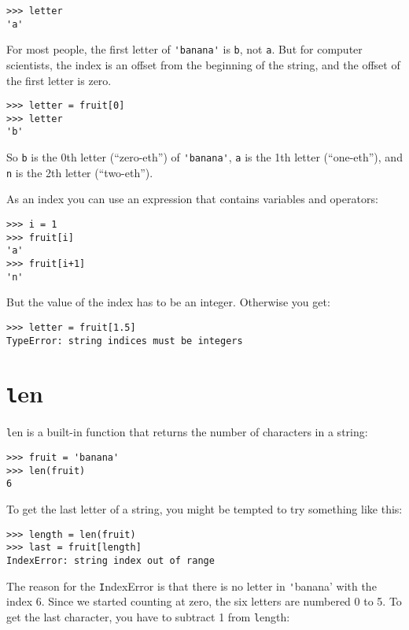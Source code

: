 \documentclass[
DIV=11,
fontsize=12,
twoside,
headinclude=false,
titlepage=firstiscover,
abstract=true,
headsepline=true,
footsepline=true,
chapterprefix=true, %
headings=big,
bibliography=totoc,%
captions=tableheading
]{scrbook}
\theoremstyle{definition}
\begin{document}
\begin{lstlisting}
>>> letter
'a'
\end{lstlisting}
%
For most people, the first letter of \verb"'banana'" is {\texttt b}, not
{\texttt a}.  But for computer scientists, the index is an offset from the
beginning of the string, and the offset of the first letter is zero.

\begin{lstlisting}
>>> letter = fruit[0]
>>> letter
'b'
\end{lstlisting}
%
So {\texttt b} is the 0th letter (``zero-eth'') of \verb"'banana'", {\texttt
  a} is the 1th letter (``one-eth''), and {\texttt n} is the 2th letter
(``two-eth'').   

As an index you can use an expression that contains variables and
operators:

\begin{lstlisting}
>>> i = 1
>>> fruit[i]
'a'
>>> fruit[i+1]
'n'
\end{lstlisting}
%

But the value of the index has to be an integer.  Otherwise you
get:

\begin{lstlisting}
>>> letter = fruit[1.5]
TypeError: string indices must be integers
\end{lstlisting}
%

\section{{\texttt len}}

{\texttt len} is a built-in function that returns the number of characters
in a string:

\begin{lstlisting}
>>> fruit = 'banana'
>>> len(fruit)
6
\end{lstlisting}
%
To get the last letter of a string, you might be tempted to try something
like this:

\begin{lstlisting}
>>> length = len(fruit)
>>> last = fruit[length]
IndexError: string index out of range
\end{lstlisting}
%
The reason for the {\texttt IndexError} is that there is no letter in {\texttt
'banana'} with the index 6.  Since we started counting at zero, the
six letters are numbered 0 to 5.  To get the last character, you have
to subtract 1 from {\texttt length}:
\end{document}
